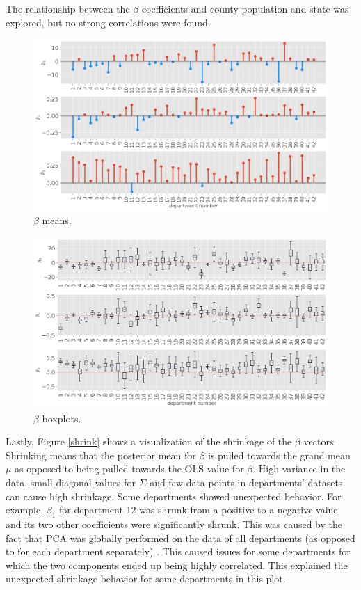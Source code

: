 \documentclass[paper=a4, fontsize=11pt]{scrartcl}
\begin{document}
The relationship between the $\beta$ coefficients and county population and state was explored, but no strong correlations were found.\\



\begin{figure}[!htb]
\centering
\includegraphics[width=1\textwidth]{project/writeup/mean_betas.png}
\caption{$\beta$ means.}
\label{all_betas}
\end{figure}


\begin{figure}[!htb]
\centering
\includegraphics[width=1\textwidth]{project/writeup/box_plots.png}
\caption{$\beta$ boxplots.}
\label{boxplot}
\end{figure}
\newpage

Lastly, Figure \ref{shrink} shows a visualization of the shrinkage of the $\beta$ vectors. Shrinking means that the posterior mean for $\beta$ is pulled towards the grand mean $\mu$ as opposed to being pulled towards the OLS value for $\beta$. High variance in the data, small diagonal values for $\Sigma$ and few data points in departments' datasets can cause high shrinkage. Some departments showed unexpected behavior. For example, $\beta_1$ for department 12 was shrunk from a positive to a negative value and its two other coefficients were significantly shrunk. This was caused by the fact that PCA was globally performed on the data of all departments (as opposed to for each department separately) . This caused issues for some departments for which the two components ended up being highly correlated. This explained the unexpected shrinkage behavior for some departments in this plot.
\end{document}
